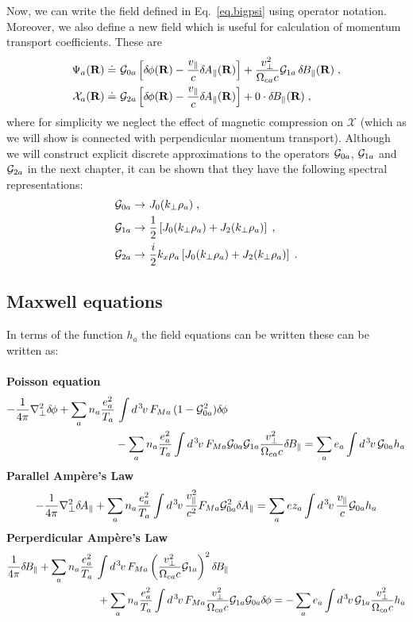 Now, we can write the field defined in Eq.~\ref{eq.bigpsi} using operator 
notation.  Moreover, we also define a new field which is useful for 
calculation of momentum transport coefficients.  These are
%
\begin{align}
\Psi_a(\mathbf{R}) \doteq &~{\cal G}_{0a} \left[ \delta \hskip -1pt \phi(\mathbf{R}) - \frac{v_\parallel}{c} \delta \hskip -1pt A_\parallel(\mathbf{R}) \right]
 + \frac{v_\perp^2}{\Omega_{ca} c} {\cal G}_{1a} \, \delta \hskip -1pt B_\parallel(\mathbf{R}) \; , \\
\mathcal{X}_a(\mathbf{R}) \doteq &~{\cal G}_{2a} \left[ \delta \hskip -1pt \phi(\mathbf{R}) - \frac{v_\parallel}{c} \delta \hskip -1pt A_\parallel(\mathbf{R}) \right]
 + 0 \cdot\delta \hskip -1pt B_\parallel(\mathbf{R}) \; , 
\end{align}
%
where for simplicity we neglect the effect of magnetic compression
on $\mathcal{X}$ (which as we will show is connected with perpendicular 
momentum transport).  Although we will construct explicit discrete 
approximations to the operators ${\cal G}_{0a}$, ${\cal G}_{1a}$ and ${\cal G}_{2a}$
in the next chapter, it can be shown that they have the following 
spectral representations:
%
\begin{align}
{\cal G}_{0a} \rightarrow &~J_0(k_\perp \rho_a) \; , \\
{\cal G}_{1a} \rightarrow &~\frac{1}{2} \left[ 
  J_0(k_\perp \rho_a) + J_2(k_\perp \rho_a) \right] \; , \\
{\cal G}_{2a} \rightarrow &~\frac{i}{2} k_x \rho_a \left[ 
  J_0(k_\perp \rho_a) + J_2(k_\perp \rho_a) \right] \; .
\end{align}

\subsection{Maxwell equations}

In terms of the function $h_a$ the field equations can be written
these can be written as:\\
\\
%
{\bf Poisson equation}
%
\begin{align}
-\frac{1}{4 \pi} \nabla_\perp^2 \delta \hskip -1pt \phi 
+ \sum_a n_a \frac{e_a^2}{T_a} & \, \int d^{\hskip 1pt 3} \hskip -1pt v \, F_{Ma} \, (1-{\cal G}_{0a}^2) \delta \hskip -1pt \phi 
\nonumber \\
& - \sum_a n_a \frac{e_a^2}{T_a} \int d^{\hskip 1pt 3} \hskip -1pt v \, F_{Ma} {\cal G}_{0a} {\cal G}_{1a}
  \frac{v_\perp^2}{\Omega_{ca} c} \delta \hskip -1pt B_\parallel 
= \sum_a e_a \int d^{\hskip 1pt 3} \hskip -1pt v \, {\cal G}_{0a} h_a 
 \label{eq.maxp}
\end{align}
%
{\bf Parallel Amp\`ere's Law}
%
\begin{equation}
-\frac{1}{4 \pi} \nabla_\perp^2 \delta \hskip -1pt A_\parallel 
+ \sum_a n_a \frac{e_a^2}{T_a} \int d^{\hskip 1pt 3} \hskip -1pt v \, \frac{v_\parallel^2}{c^2} F_{Ma} {\cal G}_{0a}^2 \delta \hskip -1pt A_\parallel
= \sum_a e z_a \int d^{\hskip 1pt 3} \hskip -1pt v \, \frac{v_\parallel}{c} {\cal G}_{0a} h_a 
 \label{eq.maxa1}
\end{equation}
%
{\bf Perperdicular Amp\`ere's Law}
%
\begin{align}
\frac{1}{4 \pi} \delta \hskip -1pt B_\parallel + \sum_a n_a \frac{e_a^2}{T_a} & \, \int d^{\hskip 1pt 3} \hskip -1pt v \, F_{Ma} 
\left( \frac{v_\perp^2}{\Omega_{ca} c} {\cal G}_{1a} \right)^2 \delta \hskip -1pt B_\parallel
\nonumber \\
&~ + \sum_a n_a \frac{e_a^2}{T_a} \int d^{\hskip 1pt 3} \hskip -1pt v \, F_{Ma} 
\frac{v_\perp^2}{\Omega_{ca} c} {\cal G}_{1a} {\cal G}_{0a} \delta \hskip -1pt \phi
= -\sum_a e_a \int d^{\hskip 1pt 3} \hskip -1pt v \, {\cal G}_{1a} \frac{v_\perp^2}{\Omega_{ca} c} h_a 
 \label{eq.maxa2}
\end{align}
%

